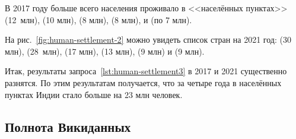 
В 2017 году больше всего населения проживало в <<населённых пунктах>> 
 (12~млн), 
 (\num{10} млн), 
 (\num{8} млн), 
 (\num{8} млн), 
 и 
 (по \num{7} млн). 

На рис.~\ref{fig:human-settlement-2} можно увидеть список стран на 2021 год: 
 (\num{30} млн), 
 (28~млн), 
 (\num{17} млн), 
 (\num{13} млн), 
 (\num{9} млн) и 
 (\num{9} млн). 

Итак, результаты запроса~\ref{lst:human-settlement3} в 2017 и 2021 существенно разнятся. 
По этим результатам получается, что за четыре года 
в населённых пунктах Индии стало больше на 23 млн человек. 


\subsection{Полнота Викиданных}

